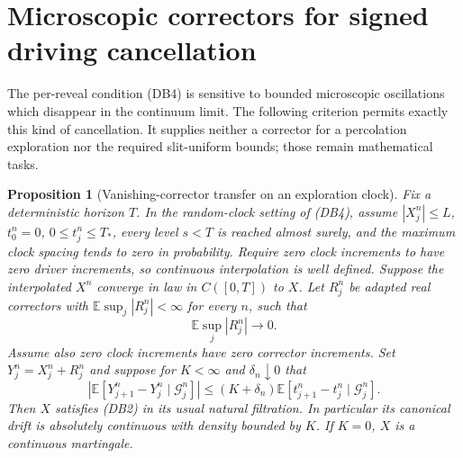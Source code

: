\documentclass[11pt]{article}
\newtheorem{proposition}[theorem]{Proposition}
\theoremstyle{definition}\newtheorem{definition}[theorem]{Definition}
\theoremstyle{remark}\newtheorem{remark}[theorem]{Remark}
\begin{document}
\section{Microscopic correctors for signed driving cancellation}
\label{sec:corrected-bias}

The per-reveal condition (DB4) is sensitive to bounded microscopic
oscillations which disappear in the continuum limit. The following
criterion permits exactly this kind of cancellation. It supplies neither
a corrector for a percolation exploration nor the required slit-uniform
bounds; those remain mathematical tasks.

\begin{proposition}[Vanishing-corrector transfer on an exploration clock]
\label{prop:corrector-bias-transfer}
Fix a deterministic horizon $T$. In the random-clock setting of (DB4),
assume $|X^n_j|\le L$, $t^n_0=0$, $0\le t^n_j\le T_*$, every level $s<T$ is
reached almost surely, and the maximum clock spacing tends to zero in
probability. Require zero clock increments to have zero driver increments,
so continuous interpolation is well defined. Suppose the interpolated
$X^n$ converge in law in $C([0,T])$ to $X$.
Let $R^n_j$ be adapted real correctors with
$\mathbb E\sup_j|R^n_j|<\infty$ for every $n$, such that
\[
 \mathbb E\sup_j|R^n_j|\longrightarrow0.
 \tag{MC1}
\]
Assume also zero clock increments have zero corrector increments.
Set $Y^n_j=X^n_j+R^n_j$ and suppose for $K<\infty$ and
$\delta_n\downarrow0$ that
\[
 \left|\mathbb E[Y^n_{j+1}-Y^n_j\mid\mathcal G^n_j]\right|
 \le (K+\delta_n)
       \mathbb E[t^n_{j+1}-t^n_j\mid\mathcal G^n_j].
 \tag{MC2}
\]
Then $X$ satisfies (DB2) in its usual natural filtration. In particular its
canonical drift is absolutely continuous with density bounded by $K$.
If $K=0$, $X$ is a continuous martingale.
\end{proposition}
\end{document}
